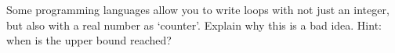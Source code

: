   Some programming languages allow you to write loops with not just an
  integer, but also with a real number as `counter'. Explain why this
  is a bad idea. Hint: when is the upper bound reached?
